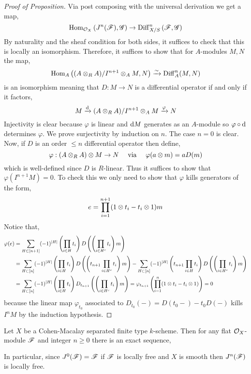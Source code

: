 \documentclass[12pt]{article}
\begin{document}
\begin{proof}[Proof of Proposition]
Via post composing with the universal derivation we get a map,
\[ \mathrm{Hom}_{\mathcal{O}_{X}} \left( J^n(\mathscr{F}), \mathscr{G} \right) \to \mathrm{Diff}^{n}_{X/S}\left( \mathscr{F}, \mathscr{G} \right) \]
By naturality and the sheaf condition for both sides, it suffices to check that this is locally an isomorphism. Therefore, it suffices to show that for $A$-modules $M,N$ the map,
\[ \mathrm{Hom}_{A} \left( (A \otimes_R A) / I^{n+1} \otimes_A M, N \right) \xrightarrow{\sim} \mathrm{Diff}^n_{A}(M,N) \]
is an isomorphism meaning that $D : M \to N$ is a differential operator if and only if it factors, \[ M \xrightarrow{\mathrm{d}} (A \otimes_R A) / I^{n+1} \otimes_A M \xrightarrow{\varphi} N \]
Injectivity is clear because $\varphi$ is linear and $\mathrm{d}{M}$ generates as an $A$-module so $\varphi \circ \mathrm{d}$ determines $\varphi$. We prove surjectivity by induction on $n$. The case $n = 0$ is clear. Now, if $D$ is an order $\le n$ differential operator then define,
\[ \varphi : (A \otimes_R A) \otimes M \to N \quad \text{ via } \quad \varphi(a \otimes m) = a D(m) \]
which is well-defined since $D$ is $R$-linear. Thus it suffices to show that $\varphi(I^{n+1} M) = 0$. To check this we only need to show that $\varphi$ kills generators of the form,
\[  e = \prod_{i = 1}^{n+1} (1 \otimes t_i - t_i \otimes 1) m \]
Notice that, 
\begin{align*}
\varphi(e) & = \sum_{H \subset [n+1]} (-1)^{|H|} \left( \prod_{i \in H} t_i \right) D \left( \left( \prod_{i \in H^c} t_i \right) m \right) 
\\
& = \sum_{H \subset [n]} (-1)^{|H|} \left( \prod_{i \in H} t_i \right) D \left( \left( t_{n+1} \prod_{i \in H^c} t_i \right) m \right) - \sum_{H \subset [n]} (-1)^{|H|} \left( t_{n+1} \prod_{i \in H} t_i \right) D \left( \left( \prod_{i \in H^c} t_i \right) m \right)
\\
& = \sum_{H \subset [n]} (-1)^{|H|} \left( \prod_{i \in H} t_i \right) D_{t_{n+1}} \left( \left( \prod_{i \in H^c} t_i \right) m \right) = \varphi_{t_{n+1}} \left( \prod_{i = 1}^n (1 \otimes t_i - t_i \otimes 1) \right) = 0
\end{align*}
because the linear map $\varphi_{t_0}$ associated to $D_{t_0}(-) = D(t_0 -) - t_0 D(-)$ kills $I^n M$ by the induction hypothesis.
\end{proof}

\begin{lemma}
Let $X$ be a Cohen-Macalay separated finite type $k$-scheme. Then for any flat $\mathcal{O}_{X}$-module $\mathscr{F}$ and integer $n \ge 0$ there is an exact sequence,
\begin{center}
\end{center}
In particular, since $J^0(\mathscr{F}) = \mathscr{F}$ if $\mathscr{F}$ is locally free and $X$ is smooth then $J^n(\mathscr{F})$ is locally free.
\end{lemma}
\end{document}

